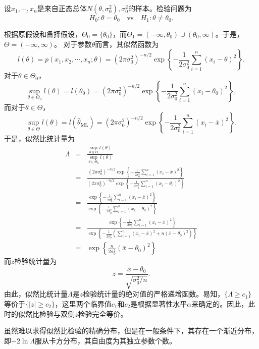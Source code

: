 \begin{example}
设$x_{1},\cdots,x_{n}$是来自正态总体$N(\theta,\sigma _{0}^{2}),\sigma _{0}^{2}$的样本。检验问题为
$$
H_{0}: \theta=\theta_{0} \quad \text{vs} \quad H_{1}: \theta \neq \theta_{0} .$$

根据原假设和备择假设，$\Theta_0 = \{\theta_0\}$，而$\Theta_1 = (-\infty,\theta_0)\cup (\theta_0,\infty)$。于是，$\Theta = (-\infty,\infty)$。
对于参数$\theta$而言，其似然函数为
$$
l(\theta) = p(x_1,x_2,\cdots,x_n;\theta) = (2\pi \sigma_0^2)^{-n/2}\exp\left\{-\frac{1}{2\sigma_0^2} \sum_{i=1}^n(x_i-\theta)^2\right\}.
$$
对于$\theta \in \Theta_0$，
$$
\sup_{\theta\in \Theta_0} l(\theta) = l(\theta_0) = (2\pi \sigma_0^2)^{-n/2}\exp\left\{-\frac{1}{2\sigma_0^2} \sum_{i=1}^n(x_i-\theta_0)^2\right\},
$$
而对于$\theta \in \Theta$，
$$
\sup_{\theta\in \Theta} l(\theta) = l(\hat{\theta}_{\text{ML}}) = (2\pi \sigma_0^2)^{-n/2}\exp\left\{-\frac{1}{2\sigma_0^2} \sum_{i=1}^n(x_i-\bar{x})^2\right\}.
$$
于是，似然比统计量为
\begin{eqnarray*}
    \Lambda &=& \frac{\sup_{\theta\in \Theta} l(\theta)}{\sup_{\theta\in \Theta_0} l(\theta)}\\
    &=& \frac{ (2\pi \sigma_0^2)^{-n/2}\exp\left\{-\frac{1}{2\sigma_0^2} \sum_{i=1}^n(x_i-\bar{x})^2\right\}}{ (2\pi \sigma_0^2)^{-n/2}\exp\left\{-\frac{1}{2\sigma_0^2} \sum_{i=1}^n(x_i-\theta_0)^2\right\}}\\
    &=& \frac{  \exp\left\{-\frac{1}{2\sigma_0^2} \sum_{i=1}^n(x_i-\bar{x})^2\right\}}{  \exp\left\{-\frac{1}{2\sigma_0^2} \sum_{i=1}^n(x_i-\theta_0)^2\right\}}\\
    &=& \frac{  \exp\left\{-\frac{1}{2\sigma_0^2} \sum_{i=1}^n(x_i-\bar{x})^2\right\}}{  \exp\left\{-\frac{1}{2\sigma_0^2} \left(\sum_{i=1}^n(x_i-\bar{x})^2 + n(\bar{x} - \theta_0)^2\right)\right\}}\\
    &=& \exp \left\{  \frac{n}{2\sigma_0^2} \left( \bar{x} - \theta_0 \right)^2\right\}
\end{eqnarray*}
而$z$检验统计量为
$$
z = \frac{\bar{x}-\theta_0}{\sqrt{\sigma_0^2/n}}.
$$
由此，似然比统计量$\Lambda$是$z$检验统计量的绝对值的严格递增函数。易知，$\{\Lambda \geq c_1\}$等价于$\{|z|\geq c_2\}$，这里两个临界值$c_1$和$c_2$是根据显著性水平$\alpha$来确定的。因此，此时的似然比检验与双侧$z$检验完全等价。
\end{example}
\begin{remark}
    虽然难以求得似然比检验的精确分布，但是在一般条件下，其存在一个渐近分布，即$-2\ln \Lambda$服从卡方分布，其自由度为其独立参数个数。
\end{remark}

